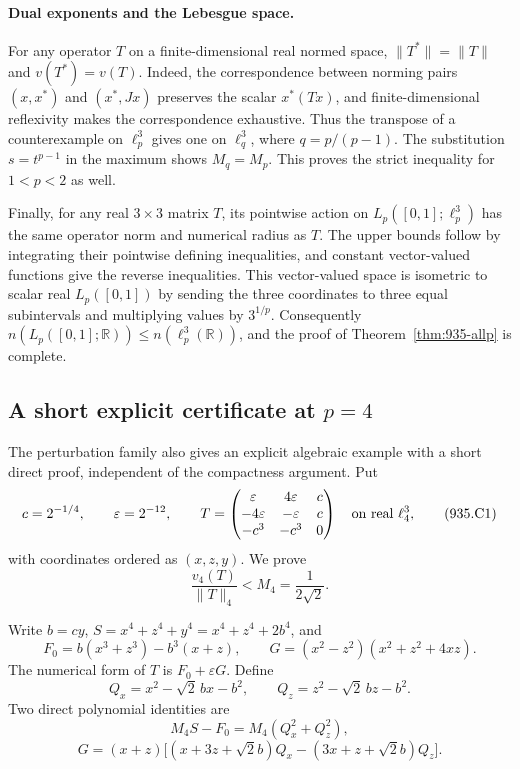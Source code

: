 \documentclass[11pt,a4paper]{article}
\theoremstyle{remark}
\begin{document}
\paragraph{Dual exponents and the Lebesgue space.}
For any operator $T$ on a finite-dimensional real normed space,
$\|T^*\|=\|T\|$ and $v(T^*)=v(T)$. Indeed, the correspondence between
norming pairs $(x,x^*)$ and $(x^*,Jx)$ preserves the scalar $x^*(Tx)$,
and finite-dimensional reflexivity makes the correspondence exhaustive.
Thus the transpose of a counterexample on $\ell_p^3$ gives one on
$\ell_q^3$, where $q=p/(p-1)$. The substitution $s=t^{p-1}$ in the maximum
shows $M_q=M_p$. This proves the strict inequality for $1<p<2$ as well.

Finally, for any real $3\times3$ matrix $T$, its pointwise action on
$L_p([0,1];\ell_p^3)$ has the same operator norm and numerical radius as
$T$. The upper bounds follow by integrating their pointwise defining
inequalities, and constant vector-valued functions give the reverse
inequalities. This vector-valued space is isometric to scalar real
$L_p([0,1])$ by sending the three coordinates to three equal subintervals
and multiplying values by $3^{1/p}$. Consequently
$n(L_p([0,1];\mathbb R))\le n(\ell_p^3(\mathbb R))$, and the proof of
Theorem~\ref{thm:935-allp} is complete.


\subsection{A short explicit certificate at \texorpdfstring{$p=4$}{p=4}}
\label{sec:935-clean}

The perturbation family also gives an explicit algebraic example with a
short direct proof, independent of the compactness argument. Put
\[
 c=2^{-1/4},\qquad \varepsilon=2^{-12},\qquad
 T=\begin{pmatrix}
 \varepsilon&4\varepsilon&c\\
 -4\varepsilon&-\varepsilon&c\\
 -c^3&-c^3&0
 \end{pmatrix}
 \quad\hbox{on real }\ell_4^3,
 \tag{935.C1}\label{eq:935-clean-matrix}
\]
with coordinates ordered as $(x,z,y)$. We prove
\[
 \frac{v_4(T)}{\|T\|_4}<M_4=\frac1{2\sqrt2}.
\]

Write $b=cy$, $S=x^4+z^4+y^4=x^4+z^4+2b^4$, and
\[
 F_0=b(x^3+z^3)-b^3(x+z),\qquad
 G=(x^2-z^2)(x^2+z^2+4xz).
\]
The numerical form of $T$ is $F_0+\varepsilon G$. Define
\[
 Q_x=x^2-\sqrt2\,bx-b^2,\qquad
 Q_z=z^2-\sqrt2\,bz-b^2.
\]
Two direct polynomial identities are
\[
 M_4S-F_0=M_4(Q_x^2+Q_z^2),
 \tag{935.C2}\label{eq:935-clean-deficit}
\]
\[
 G=(x+z)\bigl[(x+3z+\sqrt2 b)Q_x
                   -(3x+z+\sqrt2 b)Q_z\bigr].
 \tag{935.C3}\label{eq:935-clean-G}
\]
\end{document}
